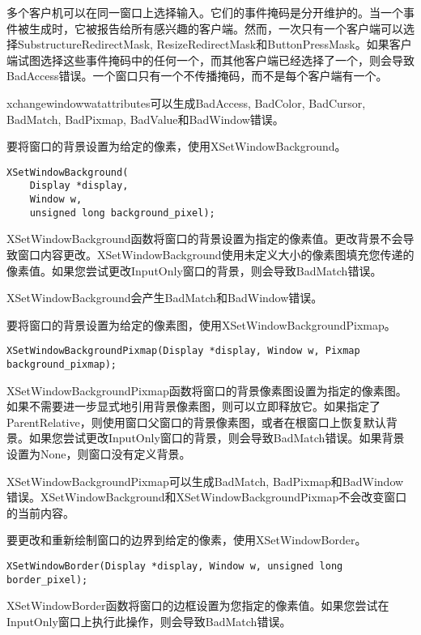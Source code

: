 多个客户机可以在同一窗口上选择输入。它们的事件掩码是分开维护的。当一个事件被生成时，它被报告给所有感兴趣的客户端。然而，一次只有一个客户端可以选择SubstructureRedirectMask, ResizeRedirectMask和ButtonPressMask。如果客户端试图选择这些事件掩码中的任何一个，而其他客户端已经选择了一个，则会导致BadAccess错误。一个窗口只有一个不传播掩码，而不是每个客户端有一个。

\noindent xchangewindowwatattributes可以生成BadAccess, BadColor, BadCursor, BadMatch, BadPixmap, BadValue和BadWindow错误。

要将窗口的背景设置为给定的像素，使用XSetWindowBackground。

\begin{lstlisting}
XSetWindowBackground(
	Display *display,
	Window w,
	unsigned long background_pixel);
\end{lstlisting}

XSetWindowBackground函数将窗口的背景设置为指定的像素值。更改背景不会导致窗口内容更改。XSetWindowBackground使用未定义大小的像素图填充您传递的像素值。如果您尝试更改InputOnly窗口的背景，则会导致BadMatch错误。

\noindent XSetWindowBackground会产生BadMatch和BadWindow错误。

\noindent 要将窗口的背景设置为给定的像素图，使用XSetWindowBackgroundPixmap。

\begin{lstlisting}
XSetWindowBackgroundPixmap(Display *display, Window w, Pixmap background_pixmap);
\end{lstlisting}

XSetWindowBackgroundPixmap函数将窗口的背景像素图设置为指定的像素图。如果不需要进一步显式地引用背景像素图，则可以立即释放它。如果指定了ParentRelative，则使用窗口父窗口的背景像素图，或者在根窗口上恢复默认背景。如果您尝试更改InputOnly窗口的背景，则会导致BadMatch错误。如果背景设置为None，则窗口没有定义背景。

XSetWindowBackgroundPixmap可以生成BadMatch, BadPixmap和BadWindow错误。XSetWindowBackground和XSetWindowBackgroundPixmap不会改变窗口的当前内容。

\noindent 要更改和重新绘制窗口的边界到给定的像素，使用XSetWindowBorder。
\begin{lstlisting}
XSetWindowBorder(Display *display, Window w, unsigned long border_pixel);
\end{lstlisting}

XSetWindowBorder函数将窗口的边框设置为您指定的像素值。如果您尝试在InputOnly窗口上执行此操作，则会导致BadMatch错误。

